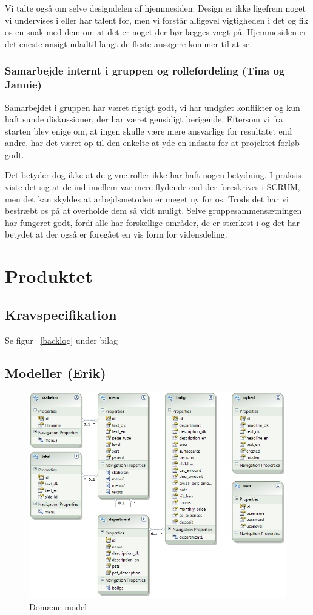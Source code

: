 \documentclass[12pt, a4paper]{report}
\begin{document}
Vi talte også om selve designdelen af hjemmesiden. Design er ikke ligefrem noget vi undervises i eller har talent for, men vi forstår alligevel vigtigheden i det og fik os en snak med dem om at det er noget der bør lægges vægt på. Hjemmesiden er det eneste ansigt udadtil langt de fleste ansøgere kommer til at se.

\subsection{Samarbejde internt i gruppen og rollefordeling (Tina og Jannie)}
Samarbejdet i gruppen har været rigtigt godt, vi har undgået konflikter og kun haft sunde diskussioner, der har været gensidigt berigende. Eftersom vi fra starten blev enige om, at ingen skulle være mere ansvarlige for resultatet end andre, har det været op til den enkelte at yde en indsats for at projektet forløb godt.

Det betyder dog ikke at de givne roller ikke har haft nogen betydning. I praksis viste det sig at de ind imellem var mere flydende end der foreskrives i SCRUM, men det kan skyldes at arbejdsmetoden er meget ny for os. Trods det har vi bestræbt os på at overholde dem så vidt muligt. Selve gruppesammensætningen har fungeret godt, fordi alle har forskellige områder, de er stærkest i og det har betydet at der også er foregået en vis form for vidensdeling.

\chapter{Produktet}
\section{Kravspecifikation}
Se figur ~\ref{backlog} under bilag

\section{Modeller (Erik)}
\begin{figure}[ht]
\includegraphics[width=\textwidth]{model}
\caption{Domæne model}
\label{model}
\end{figure}
\end{document}
